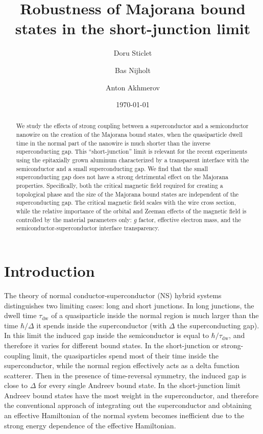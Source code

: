 \documentclass[twocolumn, notitlepage, 10pt, aps, floatfix, showpacs, prb, citeautoscript]{revtex4-1}
\newcommand{\comment}[1]{}
\begin{document}
\title{Robustness of Majorana bound states in the short-junction limit}
\begin{abstract}
We study the effects of strong coupling between a superconductor and a semiconductor nanowire on the creation of the Majorana bound states, when the quasiparticle dwell time in the normal part of the nanowire is much shorter than the inverse superconducting gap.
This ``short-junction'' limit is relevant for the recent experiments using the epitaxially grown aluminum characterized by a transparent interface with the semiconductor and a small superconducting gap.
We find that the small superconducting gap does not have a strong detrimental effect on the Majorana properties.
Specifically, both the critical magnetic field required for creating a topological phase and the size of the Majorana bound states are independent of the superconducting gap.
The critical magnetic field scales with the wire cross section, while the relative importance of the orbital and Zeeman effects of the magnetic field is controlled by the material parameters only: $g$ factor, effective electron mass, and the semiconductor-superconductor interface transparency.
\end{abstract}
\author{Doru Sticlet}
\author{Bas Nijholt}
\author{Anton Akhmerov}
\date{\today}
\maketitle

\section{Introduction}
\comment{Long vs short Josephson junction}
The theory of normal conductor-superconductor (NS) hybrid systems distinguishes two limiting cases: long and short junctions.
In long junctions, the dwell time $\tau_\textrm{dw}$ of a quasiparticle inside the normal region is much larger than the time $\hbar/\Delta$ it spends inside the superconductor (with $\Delta$ the superconducting gap).
In this limit the induced gap inside the semiconductor is equal to $\hbar/\tau_{\textrm{dw}}$, and therefore it varies for different bound states.
In the short-junction or strong-coupling limit, the quasiparticles spend most of their time inside the superconductor, while the normal region effectively acts as a delta function scatterer.
Then in the presence of time-reversal symmetry, the induced gap is close to $\Delta$ for every single Andreev bound state.
In the short-junction limit Andreev bound states have the most weight in the superconductor, and therefore the conventional approach of integrating out the superconductor and obtaining an effective Hamiltonian of the normal system becomes inefficient due to the strong energy dependence of the effective Hamiltonian.
\end{document}
